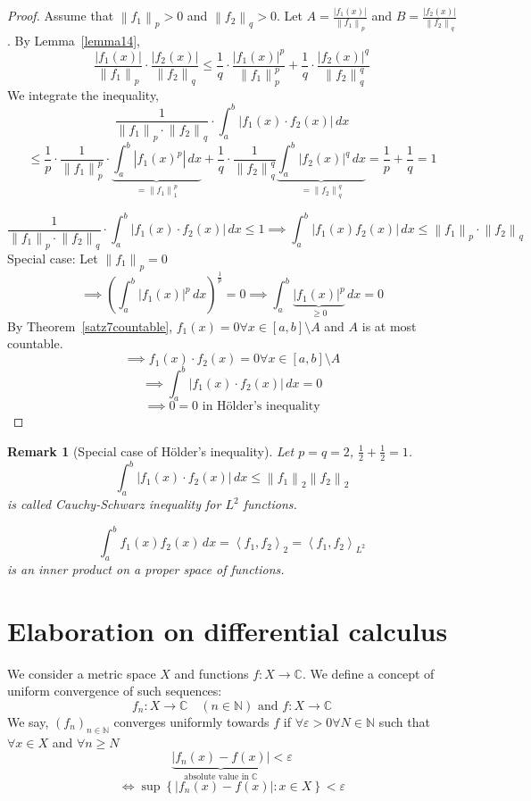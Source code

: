 \documentclass{article}
\newtheorem{remark}{Remark}  \numberwithin{remark}{section}
\newcommand{\set}[1]{\left\{#1\right\}}
\newcommand{\angel}[1]{\left\langle#1\right\rangle}
\newcommand{\norm}[1]{\left\|#1\right\|}
\newcommand{\card}[1]{\left|#1\right|}
\begin{document}
\begin{proof}
  Assume that $\norm{f_1}_p > 0$  and $\norm{f_2}_q > 0$.
  Let $A = \frac{\card{f_1(x)}}{\norm{f_1}_p}$ and $B = \frac{\card{f_2(x)}}{\norm{f_2}_q}$.
  By Lemma~\ref{lemma14},
  \[
    \frac{\card{f_1(x)}}{\norm{f_1}_p} \cdot \frac{\card{f_2(x)}}{\norm{f_2}_q}
    \leq \frac{1}{q} \cdot \frac{\card{f_1(x)}^p}{\norm{f_1}^p_p} + \frac1q \cdot \frac{\card{f_2(x)}^q}{\norm{f_2}_q^q}
  \]
  We integrate the inequality,
  \[
    \frac{1}{\norm{f_1}_p \cdot \norm{f_2}_q} \cdot \int_a^b \card{f_1(x) \cdot f_2(x)} \, dx
  \] \[
    \leq \frac{1}{p} \cdot \frac{1}{\norm{f_1}^p_p} \cdot \underbrace{\int_a^b \card{f_1(x)^p} \, dx}_{= \norm{f_1}_1^p}
    + \frac1q \cdot \frac{1}{\norm{f_2}_q^q} \underbrace{\int_a^b \card{f_2(x)}^q \, dx}_{= \norm{f_2}_q^q}
    = \frac1p + \frac1q = 1
  \]

  \[
    \frac{1}{\norm{f_1}_p \cdot \norm{f_2}_q} \cdot \int_a^b \card{f_1(x) \cdot f_2(x)} \, dx \leq 1
    \implies \int_a^b \card{f_1(x) f_2(x)} \, dx
    \leq \norm{f_1}_p \cdot \norm{f_2}_q
  \]
  Special case: Let $\norm{f_1}_p = 0$
  \[
    \implies
    \left(\int_a^b \card{f_1(x)}^p \, dx\right)^{\frac1p} = 0
    \implies \int_a^b \underbrace{\card{f_1(x)}^p}_{\geq 0} \, dx = 0
  \]
  By Theorem~\ref{satz7countable}, $f_1(x) = 0 \forall x \in [a,b] \setminus A$
  and $A$ is at most countable.
  \[ \implies f_1(x) \cdot f_2(x) = 0 \forall x \in [a,b] \setminus A \]
  \[ \implies \int_a^b \card{f_1(x) \cdot f_2(x)} \, dx = 0 \]
  \[ \implies 0 = 0 \text{ in H\"older's inequality} \]
\end{proof}

\begin{remark}[Special case of H\"older's inequality]
  Let $p = q = 2$, $\frac12 + \frac12 = 1$.
  \[ \int_a^b \card{f_1(x) \cdot f_2(x)} \, dx \leq \norm{f_1}_2 \norm{f_2}_2 \]
  is called Cauchy-Schwarz inequality for $L^2$ functions.

  \[ \int_a^b f_1(x) f_2(x) \, dx = \angel{f_1,f_2}_2 = \angel{f_1, f_2}_{L^2} \]
  is an inner product on a proper space of functions.
\end{remark}

\section{Elaboration on differential calculus}

We consider a metric space $X$ and functions $f: X \to \mathbb C$.
We define a concept of uniform convergence of such sequences:
\[ f_n: X \to \mathbb C \quad (n \in \mathbb N) \text{ and } f: X \to \mathbb C \]
We say, $(f_n)_{n \in \mathbb N}$ converges uniformly towards $f$ if $\forall \varepsilon > 0 \forall N \in \mathbb N$
such that $\forall x \in X$ and $\forall n \geq N$
\[ \underbrace{\card{f_n(x) - f(x)}}_{\text{absolute value in } \mathbb C} < \varepsilon \]
\[ \iff \sup\set{\card{f_n(x) - f(x)}: x \in X} < \varepsilon \]
\end{document}
